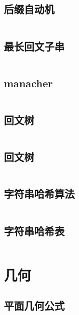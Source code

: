 \subsection{后缀自动机} 

\inputminted{cpp}{code/suffixAutomathine.cc}

\subsection{最长回文子串} 

\inputminted{cpp}{code/manacher.cc}

\subsection{manacher} 

\inputminted{cpp}{code/manacher2.cc}

\subsection{回文树} 

\inputminted{cpp}{code/PAM.cc}

\subsection{	回文树} 

\inputminted{cpp}{code/回文树.cc}

\subsection{字符串哈希算法} 

\inputminted{cpp}{code/stringhash.cc}

\subsection{字符串哈希表} 

\inputminted{cpp}{code/string_hashmap.cpp}

\section{几何} 
\subsection{平面几何公式} 

\inputminted{text}{code/Planegeometry.txt}

